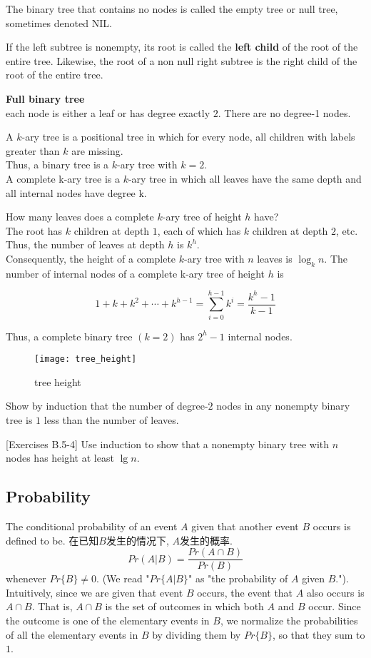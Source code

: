 \documentclass{article}
\begin{document}
The binary tree that contains no nodes is called the empty tree or null tree, sometimes denoted NIL.

If the left subtree is nonempty, its root is called the \textbf{left child} of the root of the entire tree. Likewise, the root of a non null right subtree is the right child of the root of the entire tree.

\bigskip
\textbf{Full binary tree}\\
each node is either a leaf or has degree exactly $2$. There are no degree-1 nodes.

A $k$-ary tree is a positional tree in which for every node, all children with labels greater than $k$ are missing. \\
Thus, a binary tree is a $k$-ary tree with $k = 2$.\\
A complete k-ary tree is a $k$-ary tree in which all leaves have the same depth and all internal nodes have degree k.

How many leaves does a complete $k$-ary tree of height $h$ have? \\
The root has $k$ children at depth $1$, each of which has $k$ children at depth $2$, etc. \\
Thus, the number of leaves at depth $h$ is $k^h$. \\
Consequently, the height of a complete $k$-ary tree with $n$ leaves is $\log_k n$. The number of internal nodes of a complete k-ary tree of height $h$ is

$$
1 + k + k^2 + \cdots + k^{h-1} = \sum_{i=0}^{h-1} k^i = \frac{k^h - 1}{k-1}
$$

Thus, a complete binary tree $(k=2)$ has $2^h - 1$ internal nodes.
\begin{figure}[htbp]
  \centering
  \texttt{[image: tree\_height]}\\
  \caption{tree height}\label{fig.tree.height}
\end{figure}

\bigskip
[Exercises B.5-3] Show by induction that the number of degree-$2$ nodes in any nonempty binary tree is $1$ less than the number of leaves.

[Exercises B.5-4] Use induction to show that a nonempty binary tree with $n$ nodes has height at least $\lg n$.

\subsection{Probability}
The conditional probability of an event $A$ given that another event $B$ occurs is defined to be.
在已知$B$发生的情况下, $A$发生的概率.
$$
Pr(A|B) = \dfrac{Pr(A \cap B)}{Pr(B)}
$$
whenever $Pr\{B\} \neq 0$. (We read "$Pr\{A | B\}$" as "the probability of $A$ given $B$.").
Intuitively, since we are given that event $B$ occurs, the event that $A$ also occurs is $A \cap B$. That is, $A \cap B$ is the set of outcomes in which both $A$ and $B$ occur.
Since the outcome is one of the elementary events in $B$, we normalize the probabilities of all the elementary events in $B$ by dividing them by $Pr\{B\}$, so that they sum to $1$.
\end{document}
